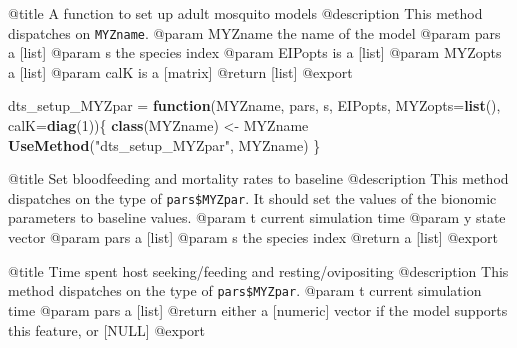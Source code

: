 \documentclass[
]{article}
\newenvironment{Shaded}{\begin{snugshade}}{\end{snugshade}}
\newcommand{\AttributeTok}[1]{\textcolor[rgb]{0.13,0.29,0.53}{#1}}
\newcommand{\ControlFlowTok}[1]{\textcolor[rgb]{0.13,0.29,0.53}{\textbf{#1}}}
\newcommand{\DecValTok}[1]{\textcolor[rgb]{0.00,0.00,0.81}{#1}}
\newcommand{\FunctionTok}[1]{\textcolor[rgb]{0.13,0.29,0.53}{\textbf{#1}}}
\newcommand{\NormalTok}[1]{#1}
\newcommand{\OtherTok}[1]{\textcolor[rgb]{0.56,0.35,0.01}{#1}}
\newcommand{\SpecialCharTok}[1]{\textcolor[rgb]{0.81,0.36,0.00}{\textbf{#1}}}
\newcommand{\StringTok}[1]{\textcolor[rgb]{0.31,0.60,0.02}{#1}}
\begin{document}
@title A function to set up adult mosquito models @description This
method dispatches on \texttt{MYZname}. @param MYZname the name of the
model @param pars a {[}list{]} @param s the species index @param EIPopts
is a {[}list{]} @param MYZopts a {[}list{]} @param calK is a
{[}matrix{]} @return {[}list{]} @export

\begin{Shaded}
\begin{Highlighting}[]
\NormalTok{dts\_setup\_MYZpar }\OtherTok{=} \ControlFlowTok{function}\NormalTok{(MYZname, pars, s, EIPopts, }\AttributeTok{MYZopts=}\FunctionTok{list}\NormalTok{(),  }\AttributeTok{calK=}\FunctionTok{diag}\NormalTok{(}\DecValTok{1}\NormalTok{))\{}
  \FunctionTok{class}\NormalTok{(MYZname) }\OtherTok{\textless{}{-}}\NormalTok{ MYZname}
  \FunctionTok{UseMethod}\NormalTok{(}\StringTok{"dts\_setup\_MYZpar"}\NormalTok{, MYZname)}
\NormalTok{\}}
\end{Highlighting}
\end{Shaded}

@title Set bloodfeeding and mortality rates to baseline @description
This method dispatches on the type of \texttt{pars\$MYZpar}. It should
set the values of the bionomic parameters to baseline values. @param t
current simulation time @param y state vector @param pars a {[}list{]}
@param s the species index @return a {[}list{]} @export

\begin{Shaded}
\end{Shaded}

@title Time spent host seeking/feeding and resting/ovipositing
@description This method dispatches on the type of
\texttt{pars\$MYZpar}. @param t current simulation time @param pars a
{[}list{]} @return either a {[}numeric{]} vector if the model supports
this feature, or {[}NULL{]} @export

\begin{Shaded}
\end{Shaded}
\end{document}
